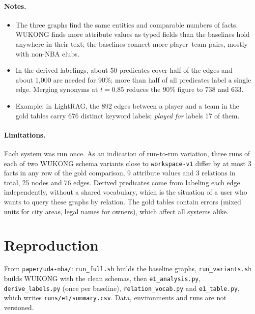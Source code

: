 \documentclass[11pt]{article}
\newcommand{\code}[1]{\texttt{#1}}
\newcommand{\wk}{WUKONG}
\begin{document}
\paragraph{Notes.}
\begin{itemize}
  \item The three graphs find the same entities and comparable numbers of facts. \wk{} finds more
    attribute values as typed fields than the baselines hold anywhere in their text; the baselines
    connect more player--team pairs, mostly with non-NBA clubs.
  \item In the derived labelings, about 50 predicates cover half of the edges and about 1,000 are
    needed for 90\%; more than half of all predicates label a single edge. Merging synonyms at
    $t = 0.85$ reduces the 90\% figure to 738 and 633.
  \item Example: in LightRAG, the 892 edges between a player and a team in the gold tables carry 676
    distinct keyword labels; \emph{played for} labels 17 of them.
\end{itemize}

\paragraph{Limitations.} Each system was run once. As an indication of run-to-run variation, three
runs of each of two \wk{} schema variants close to \code{workspace-v1} differ by at most 3 facts
in any row of the gold comparison, 9 attribute values and 3 relations in total, 25 nodes and
76 edges. Derived predicates come from labeling
each edge independently, without a shared vocabulary, which is the situation of a user who wants
to query these graphs by relation. The gold tables contain errors (mixed units for city areas,
legal names for owners), which affect all systems alike.

\section*{Reproduction}

From \code{paper/uda-nba/}: \code{run\_full.sh} builds the baseline graphs,
\code{run\_variants.sh} builds \wk{} with the clean schemas, then \code{e1\_analysis.py},
\code{derive\_labels.py} (once per baseline), \code{relation\_vocab.py} and \code{e1\_table.py},
which writes \code{runs/e1/summary.csv}. Data, environments and runs are not versioned.
\end{document}

